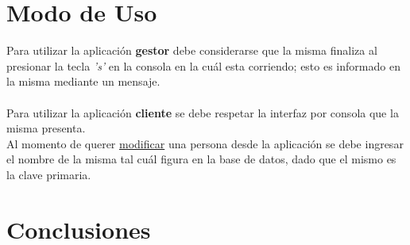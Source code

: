 \documentclass[11pt]{article}
\begin{document}
\section{Modo de Uso}
Para utilizar la aplicaci\'on {\bf gestor} debe considerarse que la misma finaliza al presionar la tecla \textit{'s'} en la consola en la cu\'al esta corriendo; 
esto es informado en la misma mediante un mensaje. \\ \\
Para utilizar la aplicaci\'on {\bf cliente} se debe respetar la interfaz por consola que la misma presenta. \\
Al momento de querer \underline{modificar} una persona desde la aplicaci\'on se debe ingresar el nombre de la misma tal cu\'al figura en la base de datos, dado que el mismo 
es la clave primaria.


\newpage


\section{Conclusiones}
\end{document}
